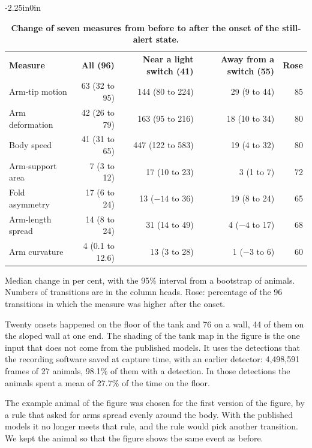 \begin{table}[!ht]
\begin{adjustwidth}{-2.25in}{0in}
\centering
\caption{{\bf Change of seven measures from before to after the onset of the still-alert state.}}
\begin{tabular}{|l|r|r|r|r|}
\hline
{\bf Measure} & {\bf All (96)} & {\bf Near a light switch (41)} & {\bf Away from a switch (55)} & {\bf Rose}\\ \thickhline
Arm-tip motion & 63 (32 to 95) & 144 (80 to 224) & 29 (9 to 44) & 85\\ \hline
Arm deformation & 42 (26 to 79) & 163 (95 to 216) & 18 (10 to 34) & 80\\ \hline
Body speed & 41 (31 to 65) & 447 (122 to 583) & 19 (4 to 32) & 80\\ \hline
Arm-support area & 7 (3 to 12) & 17 (10 to 23) & 3 (1 to 7) & 72\\ \hline
Fold asymmetry & 17 (6 to 24) & 13 ($-14$ to 36) & 19 (8 to 24) & 65\\ \hline
Arm-length spread & 14 (8 to 24) & 31 (14 to 49) & 4 ($-4$ to 17) & 68\\ \hline
Arm curvature & 4 (0.1 to 12.6) & 13 (3 to 28) & 1 ($-3$ to 6) & 60\\ \hline
\end{tabular}
\begin{flushleft}\small
Median change in per cent, with the 95\% interval from a bootstrap of animals.
Numbers of transitions are in the column heads.
Rose: percentage of the 96 transitions in which the measure was higher after the onset.
\end{flushleft}
\label{tab:restchange}
\end{adjustwidth}
\end{table}

Twenty onsets happened on the floor of the tank and 76 on a wall, 44 of them on the sloped wall at one end.
The shading of the tank map in the figure is the one input that does not come from the published models.
It uses the detections that the recording software saved at capture time, with an earlier detector: 4,498,591 frames of 27 animals, 98.1\% of them with a detection.
In those detections the animals spent a mean of 27.7\% of the time on the floor.

The example animal of the figure was chosen for the first version of the figure, by a rule that asked for arms spread evenly around the body.
With the published models it no longer meets that rule, and the rule would pick another transition.
We kept the animal so that the figure shows the same event as before.

